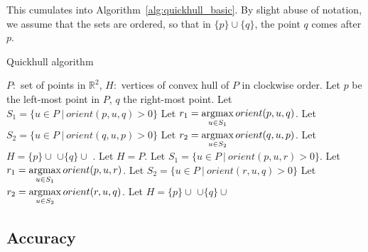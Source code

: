 This cumulates into Algorithm~\ref{alg:quickhull_basic}. By slight abuse
of notation, we assume that the sets are ordered, so that in $\{p\} \cup \{q\}$,
the point $q$ comes after $p$.

\begin{algorithm}[ht]
\begin{algorithmic}[1]
    \caption{Quickhull algorithm}\label{alg:quickhull_basic}
    \Require $P: $ set of points in $\mathbb{R}^2$,
    \Ensure $H: $ vertices of convex hull of $P$ in clockwise order.
    \State Let $p$ be the left-most point in $P$, $q$ the right-most point.
    \State Let $S_1 = \{u \in P \ | \ orient(p, u, q) > 0\}$
    \State Let $r_1 = \operatorname*{argmax}\limits_{u \in S_1}orient(p, u, q)$.
    \State Let $S_2 = \{u \in P \ | \ orient(q, u, p) > 0\}$
    \State Let $r_2 = \operatorname*{argmax}\limits_{u \in S_2}orient(q, u, p)$.
    \State Let $H = \{p\} \cup $ 
            $\cup \{q\} \cup$ .
            \State Let $H = P$.
        \Else
            \State Let $S_1 = \{u \in P \ | \ orient(p, u, r) > 0\}$.
            \State Let $r_1 = \operatorname*{argmax}\limits_{u \in S_1}orient(p, u, r)$.
            \State Let $S_2 = \{u \in P \ | \ orient(r, u, q) > 0\}$
            \State Let $r_2 = \operatorname*{argmax}\limits_{u \in S_2}orient(r, u, q)$.
            \State Let $H = \{p\} \cup $ 
                   $\cup \{q\} \cup$ 
        \EndIf
    \EndFunction
\end{algorithmic}
\end{algorithm}

\subsection{Accuracy}


